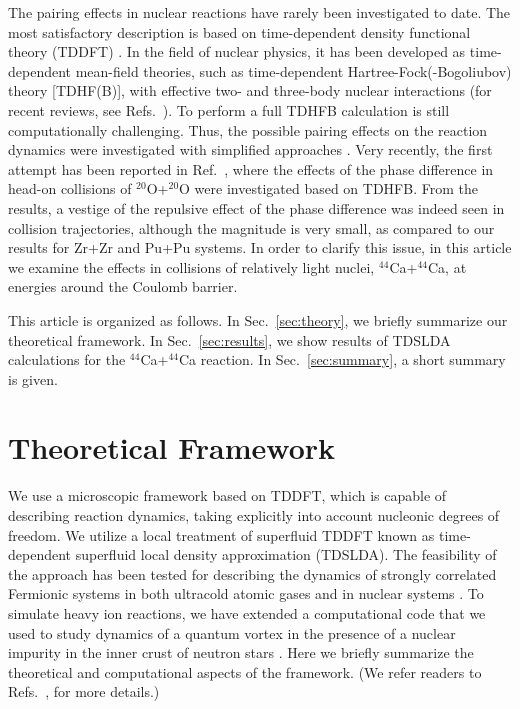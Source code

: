 \documentclass{PoS}
\begin{document}
The pairing effects in nuclear reactions have rarely been investigated to date.
The most satisfactory description is based on time-dependent
density functional theory (TDDFT) \cite{DFT1,DFT2,DFT3}. In the field of nuclear
physics, it has been developed as time-dependent mean-field theories, such as
time-dependent Hartree-Fock(-Bogoliubov) theory [TDHF(B)], with effective
two- and three-body nuclear interactions (for recent reviews, see
Refs.~\cite{Simenel(review),Nakatsukasa(review)}). To perform a full TDHFB
calculation is still computationally challenging. Thus, the possible pairing effects
on the reaction dynamics were investigated with simplified approaches
\cite{Blocki-Fkocard(1976),Ebata(2010)}. Very recently, the first attempt has been
reported in Ref.~\cite{HS(TDHFB)}, where the effects of the phase difference
in head-on collisions of $^{20}$O+$^{20}$O were investigated based on TDHFB.
From the results, a vestige of the repulsive effect of the phase difference was
indeed seen in collision trajectories, although the magnitude is very small,
as compared to our results for Zr+Zr and Pu+Pu systems. In order to clarify
this issue, in this article we examine
the effects in collisions of relatively light nuclei, $^{44}$Ca+$^{44}$Ca,
at energies around the Coulomb barrier.

This article is organized as follows.
In Sec.~\ref{sec:theory}, we briefly summarize our theoretical framework.
In Sec.~\ref{sec:results}, we show results of TDSLDA calculations for the $^{44}$Ca+$^{44}$Ca reaction.
In Sec.~\ref{sec:summary}, a short summary is given.


\section{Theoretical Framework}{\label{sec:theory}}

We use a microscopic framework based on TDDFT, which is capable of
describing reaction dynamics, taking explicitly into account nucleonic degrees of freedom. We utilize
a local treatment of superfluid TDDFT known as time-dependent superfluid
local density approximation (TDSLDA). The feasibility of the approach has been
tested for describing the dynamics of strongly correlated Fermionic systems in
both ultracold atomic gases \cite{Bulgac(2009),Bulgac(2011),UFG(2012),
Bulgac(2012),Bulgac(2013),Bulgac(2014),Gabriel(2015)} and in nuclear systems
\cite{Stetcu(2011),Stetcu(2015),Pu-fission,Piotr(2016)}. To simulate heavy
ion reactions, we have extended a computational code that we used to study
dynamics of a quantum vortex in the presence of a nuclear impurity in the
inner crust of neutron stars \cite{vortex}. Here we briefly summarize the
theoretical and computational aspects of the framework. (We refer readers
to Refs.~\cite{soliton,vortex}, for more details.)
\end{document}
